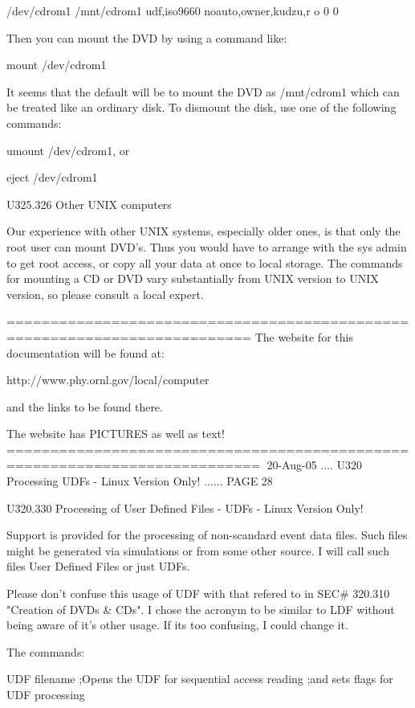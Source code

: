    /dev/cdrom1     /mnt/cdrom1      udf,iso9660 noauto,owner,kudzu,r o 0 0
 
   Then you can mount the DVD by using a command like:
 
   mount /dev/cdrom1
 
   It seems that the default will be to mount the DVD  as   /mnt/cdrom1  which
   can  be treated like an ordinary disk. To dismount the disk, use one of the
   following commands:
 
   umount /dev/cdrom1, or
 
   eject /dev/cdrom1
 
 
   U325.326  Other UNIX computers
 
   Our experience with other UNIX systems,  especially  older  ones,  is  that
   only  the  root  user  can mount DVD's. Thus you would have to arrange with
   the sys admin to get root access, or copy all your data at  once  to  local
   storage. The commands for mounting a CD or DVD vary substantially from UNIX
   version to UNIX version, so please consult a local expert.
 
   ==========================================================================
   The website for this documentation will be found at:
 
   http://www.phy.ornl.gov/local/computer
 
   and the links to be found there.
 
   The website has PICTURES as well as text!
   ===========================================================================
    
   20-Aug-05 .... U320  Processing  UDFs - Linux Version Only! ...... PAGE  28
 
 
   U320.330  Processing of User Defined Files - UDFs - Linux Version Only!
 
   Support  is  provided  for the processing of non-scandard event data files.
   Such files might be generated via simulations or from some other source.  I
   will call such files User Defined Files or just UDFs.
 
   Please  don't  confuse  this  usage  of  UDF  with  that refered to in SEC#
   320.310 "Creation of DVDs & CDs". I chose the acronym to be similar to  LDF
   without  being  aware  of  it's  other usage. If its too confusing, I could
   change it.
 
   The commands:
 
   UDF filename      ;Opens the UDF for sequential access reading
                     ;and sets flags for UDF processing
 
